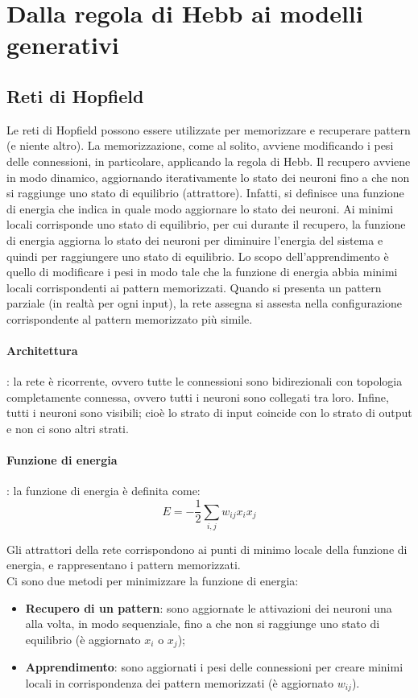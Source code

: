 \section{Dalla regola di Hebb ai modelli generativi}

\subsection{Reti di Hopfield}

Le reti di Hopfield possono essere utilizzate per memorizzare e recuperare
pattern (e niente altro).
La memorizzazione, come al solito, avviene modificando i pesi delle connessioni,
in particolare, applicando la regola di Hebb. Il recupero avviene in modo
dinamico, aggiornando iterativamente lo stato dei neuroni fino a che non si
raggiunge uno stato di equilibrio (attrattore).
Infatti, si definisce una funzione di energia che indica in quale modo
aggiornare lo stato dei neuroni. Ai minimi locali corrisponde uno stato di
equilibrio, per cui durante il recupero, la funzione di energia aggiorna lo
stato dei neuroni per diminuire l'energia del sistema e quindi per raggiungere 
uno stato di equilibrio.
Lo scopo dell'apprendimento è quello di modificare i pesi in modo tale che la
funzione di energia abbia minimi locali corrispondenti ai pattern memorizzati.
Quando si presenta un pattern parziale (in realtà per ogni input), la rete
assegna si assesta nella configurazione corrispondente al pattern
memorizzato più simile.
\paragraph{Architettura}: la rete è ricorrente, ovvero tutte le connessioni sono
bidirezionali con topologia completamente connessa, ovvero tutti i neuroni sono
collegati tra loro.
Infine, tutti i neuroni sono visibili; cioè lo strato di input coincide con lo
strato di output e non ci sono altri strati.

\paragraph{Funzione di energia}: la funzione di energia è definita come:
\begin{equation*}
	E = -\frac{1}{2} \sum_{i,j} w_{ij} x_i x_j
\end{equation*}

Gli attrattori della rete corrispondono ai punti di minimo locale della funzione
di energia, e rappresentano i pattern memorizzati.\\
Ci sono due metodi per minimizzare la funzione di energia:
\begin{itemize}
	\item \textbf{Recupero di un pattern}: sono aggiornate le attivazioni dei
		neuroni una alla volta, in modo sequenziale, fino a che non si raggiunge
		uno stato di equilibrio (è aggiornato $x_i$ o $x_j$);

	\item \textbf{Apprendimento}: sono aggiornati i pesi delle connessioni per
		creare minimi locali in corrispondenza dei pattern memorizzati (è 
		aggiornato $w_{ij}$).
\end{itemize}

